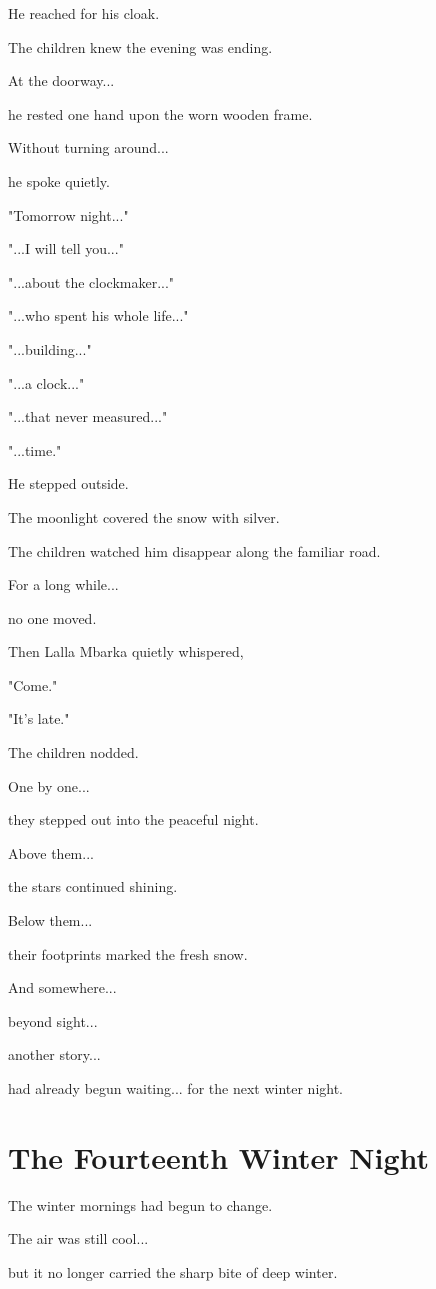 \documentclass[12pt,openany]{book}
\begin{document}
He reached for his cloak.

The children knew the evening was ending.

At the doorway...

he rested one hand upon the worn wooden frame.

Without turning around...

he spoke quietly.

"Tomorrow night..."

"...I will tell you..."

"...about the clockmaker..."

"...who spent his whole life..."

"...building..."

"...a clock..."

"...that never measured..."

"...time."

He stepped outside.

The moonlight covered the snow with silver.

The children watched him disappear along the familiar road.

For a long while...

no one moved.

Then Lalla Mbarka quietly whispered,

"Come."

"It's late."

The children nodded.

One by one...

they stepped out into the peaceful night.

Above them...

the stars continued shining.

Below them...

their footprints marked the fresh snow.

And somewhere...

beyond sight...

another story...

had already begun waiting...
for the next winter night.
\chapter{The Fourteenth Winter Night}

The winter mornings had begun to change.

The air was still cool...

but it no longer carried the sharp bite of deep winter.
\end{document}
